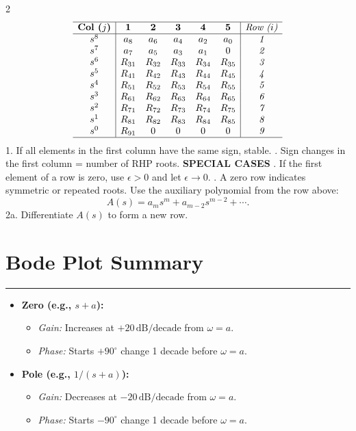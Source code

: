 \documentclass[letterpaper,10pt]{article}
\let\oldsection\section
\renewcommand{\section}[1]{%
\vspace{-1em}
  \oldsection{#1}%
  \par\vspace{-2em}%
  \noindent\rule{0.5\textwidth}{0.5pt}%
  \vspace{0em}%
}
\begin{document}
\begin{multicols}{2}
\[
\begin{array}{c|ccccc|c}
\hline
\textbf{Col (\(j\))} & \mathbf{1} & \mathbf{2} & \mathbf{3} & \mathbf{4} & \mathbf{5} & \textit{Row (\(i\))} \\ \hline
s^8 & a_8 & a_6 & a_4 & a_2 & a_0 & \textit{1} \\
s^7 & a_7 & a_5 & a_3 & a_1 & 0   & \textit{2} \\ 
s^6 & R_{31} & R_{32} & R_{33} & R_{34} & R_{35} & \textit{3} \\ 
s^5 & R_{41} & R_{42} & R_{43} & R_{44} & R_{45} & \textit{4} \\ 
s^4 & R_{51} & R_{52} & R_{53} & R_{54} & R_{55} & \textit{5} \\ 
s^3 & R_{61} & R_{62} & R_{63} & R_{64} & R_{65} & \textit{6} \\ 
s^2 & R_{71} & R_{72} & R_{73} & R_{74} & R_{75} & \textit{7} \\ 
s^1 & R_{81} & R_{82} & R_{83} & R_{84} & R_{85} & \textit{8} \\ 
s^0 & R_{91} & 0      & 0      & 0      & 0      & \textit{9} \\ 
\hline
\end{array}
\]
1. If all elements in the first column have the same sign, stable.
. Sign changes in the first column = number of RHP roots.
\newline \textbf{SPECIAL CASES}
. If the first element of a row is zero, use \(\epsilon > 0\) and let \(\epsilon \to 0\).
. A zero row indicates symmetric or repeated roots. Use the auxiliary polynomial from the row above:
\[
A(s) = a_m s^m + a_{m-2} s^{m-2} + \cdots.
\]
\vspace{-2em}
\newline
2a. Differentiate \(A(s)\) to form a new row.
\section{Bode Plot Summary}
\begin{itemize}
    \item \textbf{Zero (e.g., $s+a$):}
    \begin{itemize}
        \item \textit{Gain:} Increases at $+20\,\text{dB/decade}$ from $\omega = a$.
        \item \textit{Phase:} Starts $+90^\circ$ change 1 decade before $\omega = a$.
    \end{itemize}
    \item \textbf{Pole (e.g., $1/(s+a)$):}
    \begin{itemize}
        \item \textit{Gain:} Decreases at $-20\,\text{dB/decade}$ from $\omega = a$.
        \item \textit{Phase:} Starts $-90^\circ$ change 1 decade before $\omega = a$.
    \end{itemize}
\end{itemize}


\end{multicols}
\end{document}
